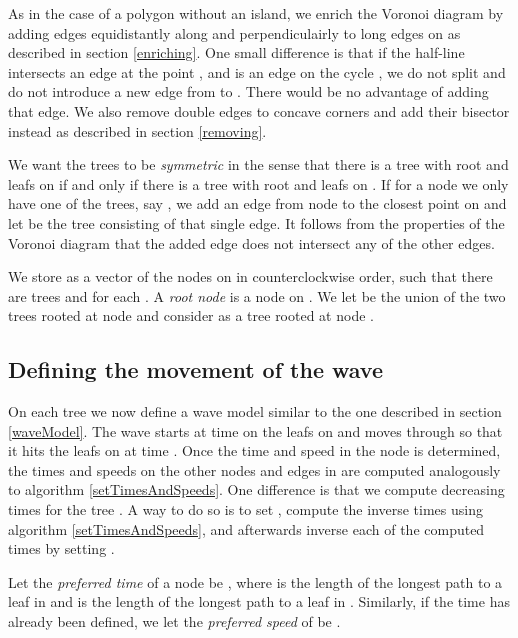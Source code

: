 \documentclass[3p]{elsarticle}
\begin{document}
As in the case of a polygon without an island,
we enrich the Voronoi diagram by adding edges equidistantly along and perpendiculairly to long
edges on  as described in section \ref{enriching}.
One small difference is that if the half-line  intersects an edge  at the point
, and  is an edge on the cycle
, we do not split  and do not introduce a new edge from  to .
There would be no advantage of adding that edge.
We also remove double edges to concave corners and add their bisector instead
as described in section \ref{removing}.

We want the trees to be \emph{symmetric} in the sense
that there is a tree  with root  and leafs on  if and only if
there is a tree  with root  and leafs on . If for a node 
we only have one of the trees, say ,
we add an edge from node  to the closest point on  and let
 be the tree consisting of that single edge.
It follows from the properties of the Voronoi diagram that the added edge does not intersect any of the
other edges.

We store  as a vector  of the nodes on 
in counterclockwise order, such that there are trees  and  for each
.
A \emph{root node} is a node  on .
We let
 be the union of the two trees rooted at node 
and consider  as a tree rooted at node .

\subsection{Defining the movement of the wave}\label{defMovement}

On each tree  we now define a wave model similar to the one described
in section \ref{waveModel}.
The wave starts at time  on the leafs on  and moves through  so that
it hits the leafs on  at time .
Once the time and speed in the node  is determined, the
times and speeds on the other nodes and edges in  are computed analogously to
algorithm \ref{setTimesAndSpeeds}. One difference is that we compute decreasing times
for the tree . A way to do so is to set ,
compute the inverse times using algorithm \ref{setTimesAndSpeeds}, and
afterwards inverse each of the computed times  by setting .

Let the \emph{preferred time} of a node  be
,
where  is the length of the longest path to a leaf in  and
 is the length of the longest path to a leaf in .
Similarly, if the time  has already been defined,
we let the \emph{preferred speed} of  be
.
\end{document}
